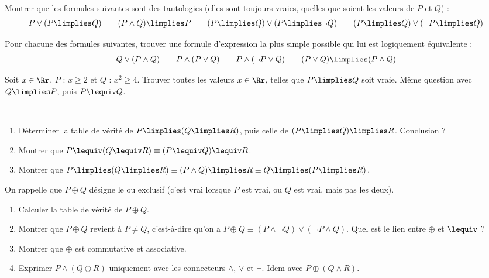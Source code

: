 \documentclass[11pt,class=report,crop=false]{standalone}
\begin{document}
\begin{exercicecours}
	Montrer que les formules suivantes sont des tautologies (elles sont toujours vraies, quelles que soient les valeurs de $P$ et $Q$) :
	\[
	P \lor (P \limplies Q) \qquad
	(P \land Q) \limplies P \qquad
	(P \limplies Q) \lor (P \limplies \lnot Q) \qquad
	(P \limplies Q) \lor (\lnot P \limplies Q)
	\]
\end{exercicecours}

\begin{exercicecours}
	Pour chacune des formules suivantes, trouver une formule d'expression la plus simple possible qui lui est logiquement équivalente :
	\[ Q \lor (P \land Q) \qquad
	P \land (P \lor Q) \qquad
	P \land (\lnot P \lor Q) \qquad
	(P \lor Q) \limplies (P \land Q)
	\]
\end{exercicecours}

\begin{exercicecours}
	Soit $x \in \Rr$, $P$ : \og{}$x \ge 2$\fg{} et $Q$ : \og{}$x^2 \ge 4$\fg{}.
	Trouver toutes les valeurs $x \in \Rr$, telles que $P \limplies Q$ soit vraie. Même question avec $Q \limplies P$, puis $P \lequiv Q$.
\end{exercicecours}

\begin{exercicecours}
	~
	\begin{enumerate}
	\item Déterminer la table de vérité de $P \limplies (Q \limplies R)$, puis celle de $(P \limplies Q) \limplies R$. Conclusion ?
	
	\item Montrer que $P \lequiv (Q \lequiv R) \equiv (P \lequiv Q) \lequiv R$.
	
	\item Montrer que $P \limplies (Q \limplies R) \equiv (P \land Q) \limplies R \equiv Q \limplies (P \limplies R)$.
	\end{enumerate}
\end{exercicecours}

\begin{exercicecours}
	On rappelle que $P \oplus Q$ désigne le \og{}ou exclusif\fg{} (c'est vrai lorsque $P$ est vrai, ou $Q$ est vrai, mais pas les deux).
	\begin{enumerate}
	\item Calculer la table de vérité de $P \oplus Q$.
	
	\item Montrer que $P \oplus Q$ revient à \og{}$P \neq Q$\fg{}, c'est-à-dire qu'on a $P \oplus Q \equiv (P \land \lnot Q) \lor (\lnot P \land Q)$. Quel est le lien entre $\oplus$ et $\lequiv$ ?
	
	\item Montrer que $\oplus$ est commutative et associative.
	
	\item Exprimer $P \land (Q \oplus R)$ uniquement avec les connecteurs $\land$, $\lor$ et $\lnot$. Idem avec $P \oplus (Q \land R)$.
	\end{enumerate}
\end{exercicecours}
\end{document}
